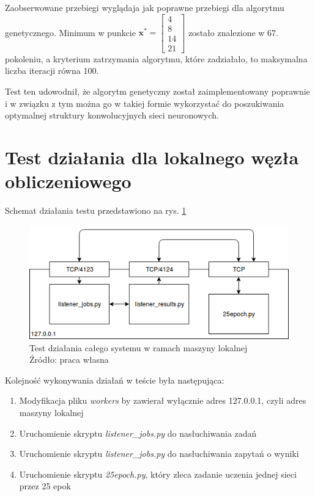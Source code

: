 Zaobserwowane przebiegi wyglądaja jak poprawne przebiegi dla algorytmu genetycznego.
Minimum w punkcie $\mathbf{x^*} = \begin{bmatrix}4 \\ 8 \\ 14 \\ 21\end{bmatrix}$ zostało znalezione w 67. pokoleniu, a kryterium zatrzymania algorytmu, które zadziałało, to maksymalna liczba iteracji równa 100.

Test ten udowodnił, że algorytm genetyczny został zaimplementowany poprawnie i w związku z tym można go w takiej formie wykorzystać do poszukiwania optymalnej struktury konwolucyjnych sieci neuronowych.

\section{Test działania dla lokalnego węzła obliczeniowego}

Schemat działania testu przedstawiono na rys. \ref{fig:localhost_test}

\begin{figure}[h!tb]
	 \centering
	 \includegraphics[width = 1.0\linewidth]{img/localhost_test}
	 \caption{Test działania całego systemu w ramach maszyny lokalnej\\
              Źródło: praca własna}
	 \label{fig:localhost_test}
\end{figure}

Kolejność wykonywania działań w teście była następująca:

\begin{enumerate}
  \item Modyfikacja pliku \textit{workers} by zawierał wyłącznie adres 127.0.0.1, czyli adres maszyny lokalnej
  \item Uruchomienie skryptu \textit{listener\_jobs.py} do nasłuchiwania zadań
  \item Uruchomienie skryptu \textit{listener\_jobs.py} do nasłuchiwania zapytań o wyniki
  \item Uruchomienie skryptu \textit{25epoch.py}, który zleca zadanie uczenia jednej sieci przez 25 epok
\end{enumerate}


